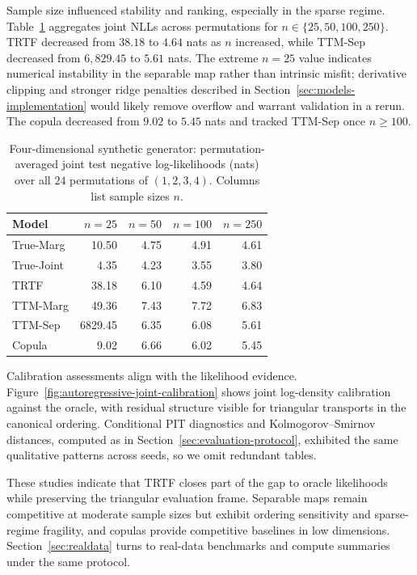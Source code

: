 \documentclass[11pt,a4paper,twoside]{book}\usepackage[]{graphicx}\usepackage[]{xcolor}
\begin{document}
Sample size influenced stability and ranking, especially in the sparse regime. Table~\ref{tab:autoregressive-perm-avg} aggregates joint NLLs across permutations for $n \in \{25, 50, 100, 250\}$. TRTF decreased from $38.18$ to $4.64$ nats as $n$ increased, while TTM-Sep decreased from $6{,}829.45$ to $5.61$ nats. The extreme $n=25$ value indicates numerical instability in the separable map rather than intrinsic misfit; derivative clipping and stronger ridge penalties described in Section~\ref{sec:models-implementation} would likely remove overflow and warrant validation in a rerun. The copula decreased from $9.02$ to $5.45$ nats and tracked TTM-Sep once $n \ge 100$.

\begin{table}[htbp]
  \centering
  \caption{Four-dimensional synthetic generator: permutation-averaged joint test negative log-likelihoods (nats) over all $24$ permutations of $(1,2,3,4)$. Columns list sample sizes $n$.}
  \label{tab:autoregressive-perm-avg}
  \begin{tabular}{lrrrr}
    \hline
    Model & $n=25$ & $n=50$ & $n=100$ & $n=250$ \\
    \hline
    True-Marg       & 10.50 & 4.75 & 4.91 & 4.61 \\
    True-Joint      & 4.35 & 4.23 & 3.55 & 3.80 \\
    TRTF              & 38.18 & 6.10 & 4.59 & 4.64 \\
    TTM-Marg          & 49.36 & 7.43 & 7.72 & 6.83 \\
    TTM-Sep           & 6829.45 & 6.35 & 6.08 & 5.61 \\
    Copula            & 9.02 & 6.66 & 6.02 & 5.45 \\
    \hline
  \end{tabular}
\end{table}

Calibration assessments align with the likelihood evidence. Figure~\ref{fig:autoregressive-joint-calibration} shows joint log-density calibration against the oracle, with residual structure visible for triangular transports in the canonical ordering. Conditional PIT diagnostics and Kolmogorov--Smirnov distances, computed as in Section~\ref{sec:evaluation-protocol}, exhibited the same qualitative patterns across seeds, so we omit redundant tables.

These studies indicate that TRTF closes part of the gap to oracle likelihoods while preserving the triangular evaluation frame. Separable maps remain competitive at moderate sample sizes but exhibit ordering sensitivity and sparse-regime fragility, and copulas provide competitive baselines in low dimensions. Section~\ref{sec:realdata} turns to real-data benchmarks and compute summaries under the same protocol.
\end{document}
